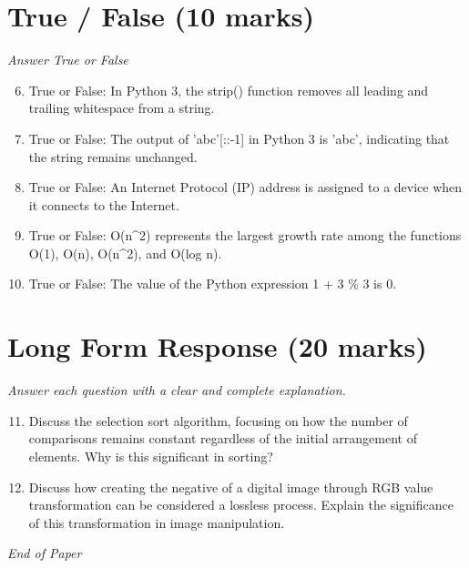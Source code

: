 \documentclass[12pt]{article}
\begin{document}
\section*{True / False (10 marks)}
\textit{Answer True or False}
\begin{enumerate}[label=\arabic*.]
\setcounter{enumi}{5}
\item True or False: In Python 3, the strip() function removes all leading and trailing whitespace from a string.
\item True or False: The output of 'abc'[::-1] in Python 3 is 'abc', indicating that the string remains unchanged.
\item True or False: An Internet Protocol (IP) address is assigned to a device when it connects to the Internet.
\item True or False: O(n\^{}2) represents the largest growth rate among the functions O(1), O(n), O(n\^{}2), and O(log n).
\item True or False: The value of the Python expression 1 + 3 \% 3 is 0.
\end{enumerate}

\section*{Long Form Response (20 marks)}
\textit{Answer each question with a clear and complete explanation.}
\begin{enumerate}[label=\arabic*.]
\setcounter{enumi}{10}
\item Discuss the selection sort algorithm, focusing on how the number of comparisons remains
constant regardless of the initial arrangement of elements. Why is this significant in
sorting?
\item Discuss how creating the negative of a digital image through RGB value transformation can
be considered a lossless process. Explain the significance of this transformation in image
manipulation.
\end{enumerate}

\vfill
\noindent\textit{End of Paper}
\end{document}
